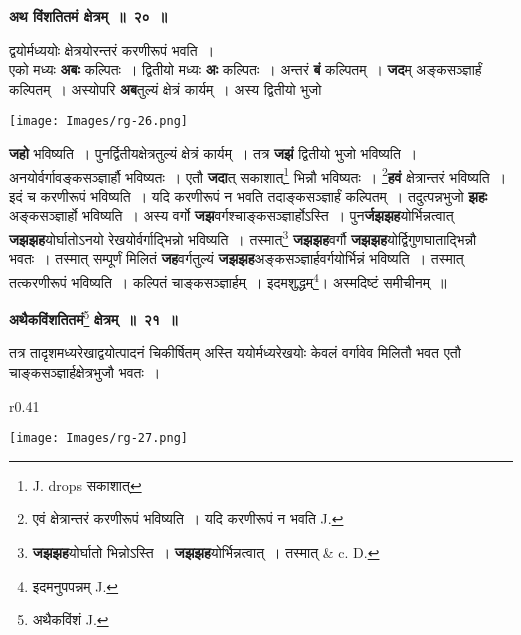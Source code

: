 \documentclass[11pt, openany]{book}
\begin{document}
\begin{center}
\textbf{\large अथ विंशतितमं क्षेत्रम्~॥~२०~॥}
\end{center}

{\ab द्वयोर्मध्ययोः क्षेत्रयोरन्तरं करणीरूपं भवति~। }\\

 एको मध्यः \textbf{अबः} कल्पितः~। द्वितीयो मध्यः \textbf{अः} कल्पितः~। अन्तरं \textbf{बं} कल्पितम्~। \textbf{जद}म् अङ्कसञ्ज्ञार्हं कल्पितम्~। अस्योपरि \textbf{अब}तुल्यं क्षेत्रं कार्यम्~। अस्य द्वितीयो भुजो

\begin{center}
\texttt{[image: Images/rg-26.png]}
\end{center}

\noindent \textbf{जहो} भविष्यति~। पुनर्द्वितीयक्षेत्रतुल्यं क्षेत्रं कार्यम्~। तत्र \textbf{जझं} द्वितीयो भुजो भविष्यति~। अनयोर्वर्गावङ्कसञ्ज्ञार्हौ भविष्यतः~। एतौ \textbf{जदा}त् सकाशात्\renewcommand{\thefootnote}{१}\footnote{{\en J. drops} सकाशात्} भिन्नौ भविष्यतः~। \renewcommand{\thefootnote}{२}\footnote{एवं क्षेत्रान्तरं करणीरूपं भविष्यति~। यदि करणीरूपं न भवति {\en J.}}\textbf{हवं} क्षेत्रान्तरं भविष्यति~। इदं च करणीरूपं भविष्यति~। यदि करणीरूपं न भवति तदाङ्कसञ्ज्ञार्हं कल्पितम्~। तदुत्पन्नभुजो \textbf{झहः} अङ्कसञ्ज्ञार्हो भविष्यति~। अस्य वर्गो \textbf{जझ}वर्गश्चाङ्कसञ्ज्ञार्होऽस्ति~। पुन\textbf{र्जझझह}योर्भिन्नत्वात् \textbf{जझझह}योर्घातोऽनयो रेखयोर्वर्गाद्भिन्नो भविष्यति~। तस्मात्\renewcommand{\thefootnote}{३}\footnote{\textbf{जझझह}योर्घातो भिन्नोऽस्ति~। \textbf{जझझह}योर्भिन्नत्वात्~। तस्मात् {\en \& c. D.}} \textbf{जझझह}वर्गौ \textbf{जझझह}योर्द्विगुणघाताद्भिन्नौ भवतः~। तस्मात् सम्पूर्णं मिलितं \textbf{जह}वर्गतुल्यं \textbf{जझझह}अङ्कसञ्ज्ञार्हवर्गयोर्भिन्नं भविष्यति~। तस्मात् तत्करणीरूपं भविष्यति~। कल्पितं चाङ्कसञ्ज्ञार्हम्~। इदमशुद्धम्\renewcommand{\thefootnote}{४}\footnote{इदमनुपपन्नम् {\en J.}}\;। अस्मदिष्टं समीचीनम्~॥ 

\newpage
\begin{center}
\textbf{\large अथैकविंशतितमं}\renewcommand{\thefootnote}{१}\footnote{अथैकविंशं {\en J.}} \textbf{\large क्षेत्रम्~॥~२१~॥}
\end{center}

{\ab  तत्र तादृशमध्यरेखाद्वयोत्पादनं चिकीर्षितम् अस्ति ययोर्मध्यरेखयोः केवलं वर्गावेव मिलितौ भवत एतौ चाङ्कसञ्ज्ञार्हक्षेत्रभुजौ भवतः~।}\\

\begin{wrapfigure}{r}{0.41\textwidth}
\vspace{-10mm}
\begin{center}
\texttt{[image: Images/rg-27.png]}
\end{center}
\vspace{-8mm}
\end{wrapfigure}
\end{document}
